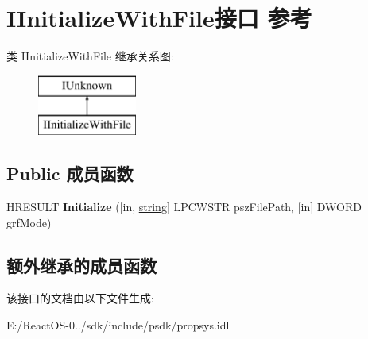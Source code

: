 \hypertarget{interface_i_initialize_with_file}{}\section{I\+Initialize\+With\+File接口 参考}
\label{interface_i_initialize_with_file}
类 I\+Initialize\+With\+File 继承关系图\+:\begin{figure}[H]
\begin{center}
\leavevmode
\includegraphics[height=2.000000cm]{interface_i_initialize_with_file}
\end{center}
\end{figure}
\subsection*{Public 成员函数}
\begin{DoxyCompactItemize}
\item 
\mbox{\label{interface_i_initialize_with_file_a17ec122d27507a57b26bae4ecc002c09}} 
H\+R\+E\+S\+U\+LT {\bfseries Initialize} (\mbox{[}in, \hyperlink{structstring}{string}\mbox{]} L\+P\+C\+W\+S\+TR psz\+File\+Path, \mbox{[}in\mbox{]} D\+W\+O\+RD grf\+Mode)
\end{DoxyCompactItemize}
\subsection*{额外继承的成员函数}


该接口的文档由以下文件生成\+:\begin{DoxyCompactItemize}
\item 
E\+:/\+React\+O\+S-\/0../sdk/include/psdk/propsys.\+idl\end{DoxyCompactItemize}
